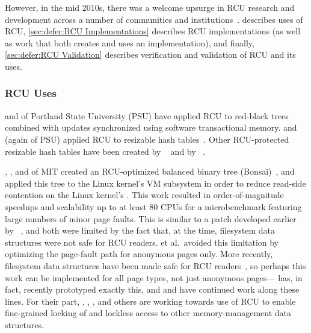 However, in the mid 2010s, there was a welcome upsurge in RCU research
and development across a number of communities and
institutions~\cite{FransKaashoek2015ParallelOSHistory}.
 describes uses of RCU,
\cref{sec:defer:RCU Implementations} describes RCU implementations
(as well as work that both creates and uses an implementation),
and finally,
\cref{sec:defer:RCU Validation} describes verification and validation
of RCU and its uses.

\subsubsection{RCU Uses}
\label{sec:defer:RCU Uses}

 and  of Portland State University
(PSU) have
applied RCU to red-black
trees~\cite{PhilHowardPhD,PhilHoward2011RCUTMRBTree} combined with updates
synchronized using software transactional memory.
 and  (again of PSU)
applied RCU to resizable
hash tables~\cite{JoshTriplettPhD,Triplett:2011:RPHash,JonCorbet2014RCUhash1,JonCorbet2014RCUhash2}.
Other RCU-protected resizable hash tables have been created by
~\cite{HerbertXu2010RCUResizeHash} and by
~\cite{PaulMcKenney2013LWNURCUhash}.

, , and 
of MIT created an RCU-optimized balanced binary tree
(Bonsai)~\cite{AustinClements2012RCULinux:mmapsem}, and applied this
tree to the Linux kernel's VM subsystem in order to reduce read-side
contention on the Linux kernel's .
This work resulted in order-of-magnitude speedups and scalability up to
at least 80 CPUs for a microbenchmark featuring large numbers of minor
page faults.
This is similar to a patch developed earlier by
~\cite{PeterZijlstra2014SpeculativePageFault}, and both
were limited by the fact that, at the time, filesystem data structures
were not safe for RCU readers.
 et al.\ avoided this limitation by
optimizing the page-fault
path for anonymous pages only.
More recently, filesystem data structures have been made safe for RCU
readers~\cite{JonathanCorbet2010dcacheRCU,JonathanCorbet2011dcacheRCUbug},
so perhaps this work can be implemented for all page types, not just
anonymous pages--- has, in fact, recently prototyped
exactly this, and  and  have
continued work along these lines.
For their part, , ,
, and others are working towards use of
RCU to enable fine-grained locking of and lockless access to other
memory-management data structures.

